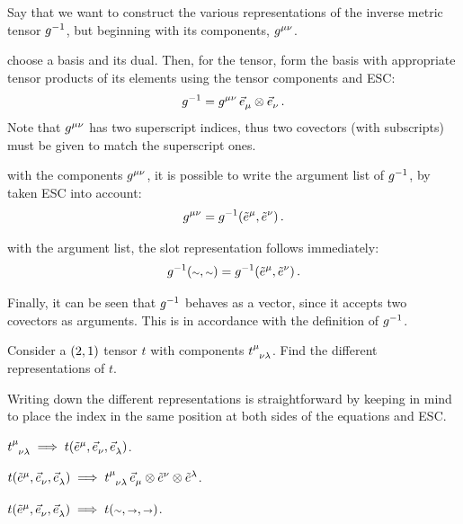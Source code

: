 \begin{example}
  Say that we want to construct the various representations of the inverse metric tensor ${g}^{-1}$, but beginning with its components, $\tinvmet\mu\nu$.
\end{example}
%
\begin{solution}
   choose a basis and its dual. Then, for the tensor, form the basis with appropriate tensor products of its elements using the tensor components and ESC:
  \begin{equation*}
    \invmet = \tinvmet\mu\nu\,\tbvec\mu\tprod\tbvec\nu\,.
  \end{equation*}
  Note that $\tinvmet\mu\nu$ has two superscript indices, thus two covectors (with subscripts) must be given to match the superscript ones.
  
   with the components $\tinvmet\mu\nu$, it is possible to write the argument list of ${g}^{-1}$, by taken ESC into account:
  \begin{equation*}
    \tinvmet\mu\nu = \invmet\vat{\tbcov\mu,\tbcov\nu}\,.
  \end{equation*}
  
   with the argument list, the slot representation follows immediately:
  \begin{equation*}
    \invmet\vat{\cslot,\cslot} = \invmet\vat{\tbcov\mu,\tbcov\nu}\,.
  \end{equation*}
  
  Finally, it can be seen that ${g}^{-1}$ behaves as a vector, since it accepts two covectors as arguments. This is in accordance with the definition of ${g}^{-1}$.
\end{solution}

\begin{example}
  Consider a $\torder 21$ tensor $t$ with components $\tensor{t}{^\mu_\nu_\lambda}$. Find the different representations of $t$.
\end{example}
%
\begin{solution}
  Writing down the different representations is straightforward by keeping in mind to place the index in the same position at both sides of the equations and ESC.

   $\tensor{t}{^\mu_\nu_\lambda}\implies t\vat{\tbcov\mu,\tbvec\nu,\tbvec\lambda}$.
  
   $t\vat{\tbcov\mu,\tbvec\nu,\tbvec\lambda}\implies \tensor{t}{^\mu_\nu_\lambda}\,\tbvec\mu\tprod\tbcov\nu\tprod\tbcov\lambda$.
  
   $t\vat{\tbcov\mu,\tbvec\nu,\tbvec\lambda}\implies t\vat{\cslot,\vslot,\vslot}$.
\end{solution}


